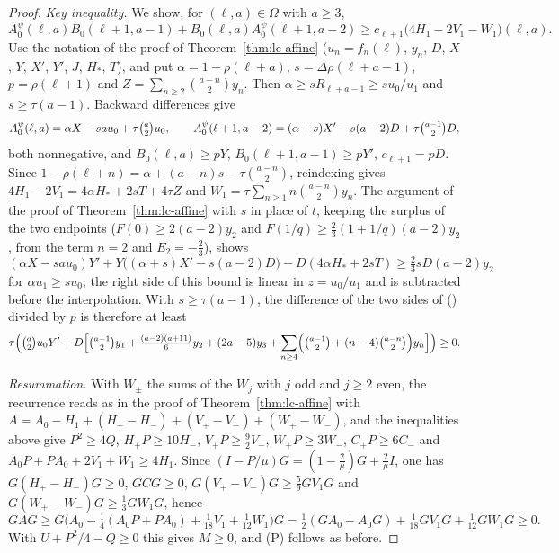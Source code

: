 \documentclass[twoside,10pt]{article}
\numberwithin{equation}{section}
\theoremstyle{slbody}
\theoremstyle{definition}
\theoremstyle{remark}
\renewcommand{\eqref}[1]{\textup{{\normalfont(\oldstylenums{\ref{#1}}}\normalfont)}}
\begin{document}
\begin{proof}
\emph{Key inequality.} We show, for $(\ell,a)\in\Omega$ with $a\geq3$,
\begin{equation}\label{eq:quad-key}
A^\psi_0(\ell,a)B_0(\ell+1,a-1)+B_0(\ell,a)A^\psi_0(\ell+1,a-2)\geq c_{\ell+1}\bigl(4H_1-2V_1-W_1\bigr)(\ell,a).
\end{equation}
Use the notation of the proof of Theorem~\ref{thm:lc-affine} ($u_n=f_n(\ell)$, $y_n$, $D$, $X$, $Y$, $X'$, $Y'$, $J$, $H_*$, $T$), and put $\alpha=1-\rho(\ell+a)$, $s=\Delta\rho(\ell+a-1)$, $p=\rho(\ell+1)$ and $Z=\sum_{n\geq2}\binom{a-n}2y_n$. Then $\alpha\geq sR_{\ell+a-1}\geq su_0/u_1$ and $s\geq\tau(a-1)$. Backward differences give
\[
A^\psi_0(\ell,a)=\alpha X-sau_0+\tau\tbinom a2u_0,\qquad A^\psi_0(\ell+1,a-2)=(\alpha+s)X'-s(a-2)D+\tau\tbinom{a-1}2D,
\]
both nonnegative, and $B_0(\ell,a)\geq pY$, $B_0(\ell+1,a-1)\geq pY'$, $c_{\ell+1}=pD$. Since $1-\rho(\ell+n)=\alpha+(a-n)s-\tau\binom{a-n}2$, reindexing gives $4H_1-2V_1=4\alpha H_*+2sT+4\tau Z$ and $W_1=\tau\sum_{n\geq1}n\binom{a-n}2y_n$. The argument of the proof of Theorem~\ref{thm:lc-affine} with $s$ in place of $t$, keeping the surplus of the two endpoints ($F(0)\geq2(a-2)y_2$ and $F(1/q)\geq\frac23(1+1/q)(a-2)y_2$, from the term $n=2$ and $E_2=-\frac23$), shows
\[
(\alpha X-sau_0)Y'+Y\bigl((\alpha+s)X'-s(a-2)D\bigr)-D(4\alpha H_*+2sT)\geq\tfrac23sD(a-2)y_2
\]
for $\alpha u_1\geq su_0$; the right side of this bound is linear in $z=u_0/u_1$ and is subtracted before the interpolation. With $s\geq\tau(a-1)$, the difference of the two sides of \eqref{eq:quad-key} divided by $p$ is therefore at least
\[
\tau\Bigl(\tbinom a2u_0Y'+D\Bigl[\tbinom{a-1}2y_1+\tfrac{(a-2)(a+11)}6y_2+(2a-5)y_3+\sum_{n\geq4}\Bigl(\tbinom{a-1}2+(n-4)\tbinom{a-n}2\Bigr)y_n\Bigr]\Bigr)\geq0.
\]

\emph{Resummation.} With $W_\pm$ the sums of the $W_j$ with $j$ odd and $j\geq2$ even, the recurrence reads as in the proof of Theorem~\ref{thm:lc-affine} with $A=A_0-H_1+(H_+-H_-)+(V_+-V_-)+(W_+-W_-)$, and the inequalities above give $P^2\geq4Q$, $H_+P\geq10H_-$, $V_+P\geq\frac92V_-$, $W_+P\geq3W_-$, $C_+P\geq6C_-$ and $A_0P+PA_0+2V_1+W_1\geq4H_1$. Since $(I-P/\mu)G=(1-\frac2\mu)G+\frac2\mu I$, one has $G(H_+-H_-)G\geq0$, $GCG\geq0$, $G(V_+-V_-)G\geq\frac59GV_1G$ and $G(W_+-W_-)G\geq\frac13GW_1G$, hence
\[
GAG\geq G\bigl(A_0-\tfrac14(A_0P+PA_0)+\tfrac1{18}V_1+\tfrac1{12}W_1\bigr)G=\tfrac12(GA_0+A_0G)+\tfrac1{18}GV_1G+\tfrac1{12}GW_1G\geq0.
\]
With $U+P^2/4-Q\geq0$ this gives $M\geq0$, and (P) follows as before.
\end{proof}
\end{document}

